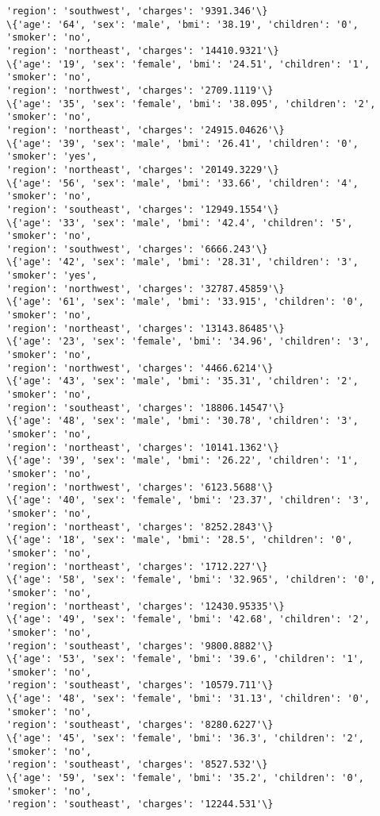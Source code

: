 \documentclass[11pt]{article}
\begin{document}
\begin{Verbatim}[commandchars=\\\{\}]
'region': 'southwest', 'charges': '9391.346'\}
\{'age': '64', 'sex': 'male', 'bmi': '38.19', 'children': '0', 'smoker': 'no',
'region': 'northeast', 'charges': '14410.9321'\}
\{'age': '19', 'sex': 'female', 'bmi': '24.51', 'children': '1', 'smoker': 'no',
'region': 'northwest', 'charges': '2709.1119'\}
\{'age': '35', 'sex': 'female', 'bmi': '38.095', 'children': '2', 'smoker': 'no',
'region': 'northeast', 'charges': '24915.04626'\}
\{'age': '39', 'sex': 'male', 'bmi': '26.41', 'children': '0', 'smoker': 'yes',
'region': 'northeast', 'charges': '20149.3229'\}
\{'age': '56', 'sex': 'male', 'bmi': '33.66', 'children': '4', 'smoker': 'no',
'region': 'southeast', 'charges': '12949.1554'\}
\{'age': '33', 'sex': 'male', 'bmi': '42.4', 'children': '5', 'smoker': 'no',
'region': 'southwest', 'charges': '6666.243'\}
\{'age': '42', 'sex': 'male', 'bmi': '28.31', 'children': '3', 'smoker': 'yes',
'region': 'northwest', 'charges': '32787.45859'\}
\{'age': '61', 'sex': 'male', 'bmi': '33.915', 'children': '0', 'smoker': 'no',
'region': 'northeast', 'charges': '13143.86485'\}
\{'age': '23', 'sex': 'female', 'bmi': '34.96', 'children': '3', 'smoker': 'no',
'region': 'northwest', 'charges': '4466.6214'\}
\{'age': '43', 'sex': 'male', 'bmi': '35.31', 'children': '2', 'smoker': 'no',
'region': 'southeast', 'charges': '18806.14547'\}
\{'age': '48', 'sex': 'male', 'bmi': '30.78', 'children': '3', 'smoker': 'no',
'region': 'northeast', 'charges': '10141.1362'\}
\{'age': '39', 'sex': 'male', 'bmi': '26.22', 'children': '1', 'smoker': 'no',
'region': 'northwest', 'charges': '6123.5688'\}
\{'age': '40', 'sex': 'female', 'bmi': '23.37', 'children': '3', 'smoker': 'no',
'region': 'northeast', 'charges': '8252.2843'\}
\{'age': '18', 'sex': 'male', 'bmi': '28.5', 'children': '0', 'smoker': 'no',
'region': 'northeast', 'charges': '1712.227'\}
\{'age': '58', 'sex': 'female', 'bmi': '32.965', 'children': '0', 'smoker': 'no',
'region': 'northeast', 'charges': '12430.95335'\}
\{'age': '49', 'sex': 'female', 'bmi': '42.68', 'children': '2', 'smoker': 'no',
'region': 'southeast', 'charges': '9800.8882'\}
\{'age': '53', 'sex': 'female', 'bmi': '39.6', 'children': '1', 'smoker': 'no',
'region': 'southeast', 'charges': '10579.711'\}
\{'age': '48', 'sex': 'female', 'bmi': '31.13', 'children': '0', 'smoker': 'no',
'region': 'southeast', 'charges': '8280.6227'\}
\{'age': '45', 'sex': 'female', 'bmi': '36.3', 'children': '2', 'smoker': 'no',
'region': 'southeast', 'charges': '8527.532'\}
\{'age': '59', 'sex': 'female', 'bmi': '35.2', 'children': '0', 'smoker': 'no',
'region': 'southeast', 'charges': '12244.531'\}

\end{Verbatim}
\end{document}
